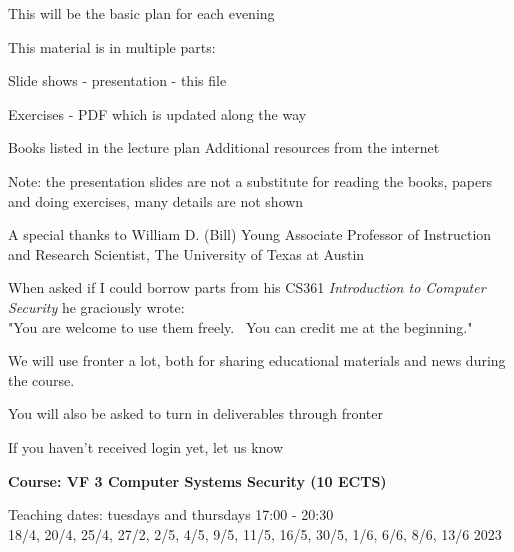 \documentclass[Screen16to9,17pt]{foils}
\begin{document}
\vskip 1cm
\centerline{\Large This will be the basic plan for each evening}


\begin{list1}
\item This material is in multiple parts:
\begin{list2}
\item Slide shows - presentation - this file
\item Exercises - PDF which is updated along the way
\end{list2}
\item Books listed in the lecture plan Additional resources from the internet
\end{list1}

Note: the presentation slides are not a substitute for reading the books, papers and doing exercises, many details are not shown

A special thanks to William D. (Bill) Young
Associate Professor of Instruction and Research Scientist,
The University of Texas at Austin

When asked if I could borrow parts from his CS361 \emph{Introduction to Computer Security} he graciously wrote:\\
"You are welcome to use them freely.  You can credit me at the beginning." 




We will use fronter a lot, both for sharing educational materials and news during the course.

You will also be asked to turn in deliverables through fronter


\vskip 5mm
\centerline{If you haven't received login yet, let us know}





{\Large\bf Course: VF 3  Computer Systems Security (10 ECTS)}

Teaching dates: tuesdays and thursdays 17:00 - 20:30\\
18/4, 20/4, 25/4, 27/2, 2/5, 4/5, 9/5, 11/5, 16/5, 30/5, 1/6, 6/6, 8/6, 13/6 2023
\end{document}
